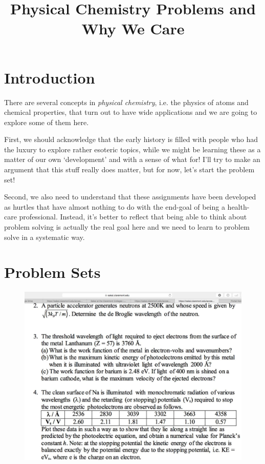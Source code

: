 \documentclass{article}
\title{Physical Chemistry Problems and Why We Care}
\begin{document}

\maketitle

\section{Introduction}

There are several concepts in \emph{physical chemistry}, i.e. the physics of atoms and chemical properties, that turn out to have wide applications and we are going to explore some of them here. 

First, we should acknowledge that the early history is filled with people who had the luxury to explore rather esoteric topics, while we might be learning these as a matter of our own `development' and with a sense of what for!  I'll try to make an argument that this stuff really does matter, but for now, let's start the problem set!

Second, we also need to understand that these assignments have been developed as hurtles that have almost nothing to do with the end-goal of being a health-care professional. Instead, it's better to reflect that being able to think about problem solving is actually the real goal here and we need to learn to problem solve in a systematic way.


\section{Problem Sets}

\begin{figure}
\includegraphics{ProblemSet}
\end{figure}
\end{document}
